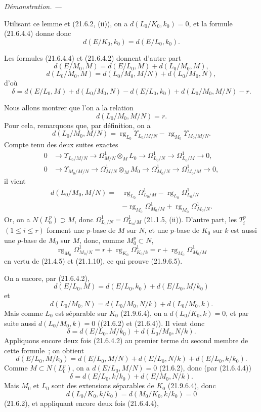 \documentclass[10pt,oneside]{book}
\newcommand{\oldpage}[2][]{%
  \setcounter{footnote}{0}%
  \marginpar{\scriptsize\textbf{#1}~|~#2}\ignorespaces}
\newenvironment{proof}{%
  \par\medskip\noindent\textit{Démonstration. ---\ }}{\par}
\begin{document}
\begin{proof}
\begin{enumerate}
  Utilisant ce lemme et (21.6.2, (ii)), on a $d(L_0/K_0,k_0)=0$, et la
  formule (21.6.4.4) donne donc
  \[
    d(E/K_0,k_0)=d(E/L_0,k_0).
  \]

  \oldpage[0\textsubscript{IV-1}]{180}
  Les formules (21.6.4.4) et (21.6.4.2) donnent d'autre part
  \[
    d(E/M_0,M)=d(E/L_0,M)+d(L_0/M_0,M),
  \]
  \[
    d(L_0/M_0,M)=d(L_0/M_0,M/N)+d(L_0/M_0,N),
  \]
  d'où
  \[
    \delta=d(E/L_0,M)+d(L_0/M_0,N)-d(E/L_0,k_0)
    +d(L_0/M_0,M/N)-r.
  \]

  Nous allons montrer que l'on a la relation
  \begin{equation}
  \tag{21.9.6.5}
  \label{0.21.9.6.5-fr}
    d(L_0/M_0,M/N)=r.
  \end{equation}
  Pour cela, remarquons que, par définition, on a
  \[
    d(L_0/M_0,M/N)
    =\operatorname{rg}_{L_0}\Upsilon_{L_0/M/N}
    -\operatorname{rg}_{M_0}\Upsilon_{M_0/M/N}.
  \]
  Compte tenu des deux suites exactes
  \[
  \begin{aligned}
    0&\longrightarrow\Upsilon_{L_0/M/N}
      \longrightarrow\Omega^1_{M/N}\otimes_ML_0
      \longrightarrow\Omega^1_{L_0/N}
      \longrightarrow\Omega^1_{L_0/M}\longrightarrow0,\\
    0&\longrightarrow\Upsilon_{M_0/M/N}
      \longrightarrow\Omega^1_{M/N}\otimes_MM_0
      \longrightarrow\Omega^1_{M_0/N}
      \longrightarrow\Omega^1_{M_0/M}\longrightarrow0,
  \end{aligned}
  \]
  il vient
  \[
  \begin{split}
    d(L_0/M_0,M/N)={}&\operatorname{rg}_{L_0}\Omega^1_{L_0/M}
      -\operatorname{rg}_{L_0}\Omega^1_{L_0/N}\\
      &-\operatorname{rg}_{M_0}\Omega^1_{M_0/M}
      +\operatorname{rg}_{M_0}\Omega^1_{M_0/N}.
  \end{split}
  \]
  Or, on a $N(L_0^p)\supset M$, donc
  $\Omega^1_{L_0/N}=\Omega^1_{L_0/M}$ (21.1.5, (ii)). D'autre part, les
  $T_i^p$ $(1\leqslant i\leqslant r)$ forment une $p$-base de $M$ sur $N$,
  et une $p$-base de $K_0$ sur $k$ est aussi une $p$-base de $M_0$ sur $M$,
  donc, comme $M_0^p\subset N$,
  \[
    \operatorname{rg}_{M_0}\Omega^1_{M_0/N}
    =r+\operatorname{rg}_{K_0}\Omega^1_{K_0/k}
    =r+\operatorname{rg}_{M_0}\Omega^1_{M_0/M}
  \]
  en vertu de (21.4.5) et (21.1.10), ce qui prouve (21.9.6.5).

  On a encore, par (21.6.4.2),
  \[
    d(E/L_0,M)=d(E/L_0,k_0)+d(E/L_0,M/k_0)
  \]
  et
  \[
    d(L_0/M_0,N)=d(L_0/M_0,N/k)+d(L_0/M_0,k).
  \]
  Mais comme $L_0$ est séparable sur $K_0$ (21.9.6.4), on a
  $d(L_0/K_0,k)=0$, et par suite aussi $d(L_0/M_0,k)=0$ ((21.6.2) et
  (21.6.4)). Il vient donc
  \[
    \delta=d(E/L_0,M/k_0)+d(L_0/M_0,N/k).
  \]
  Appliquons encore deux fois (21.6.4.2) au premier terme du second membre de
  cette formule~; on obtient
  \[
    d(E/L_0,M/k_0)=d(E/L_0,M/N)+d(E/L_0,N/k)+d(E/L_0,k/k_0).
  \]
  Comme $M\subset N(L_0^p)$, on a $d(E/L_0,M/N)=0$ (21.6.2), donc (par
  (21.6.4.4))
  \[
    \delta=d(E/L_0,k/k_0)+d(E/M_0,N/k).
  \]
  Mais $M_0$ et $L_0$ sont des extensions séparables de $K_0$ (21.9.6.4),
  donc
  \[
    d(L_0/K_0,k/k_0)=d(M_0/K_0,k/k_0)=0
  \]
  (21.6.2), et appliquant encore deux fois (21.6.4.4),


\end{enumerate}
\end{proof}
\end{document}
